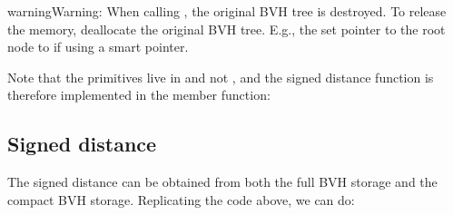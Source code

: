 \documentclass[letterpaper,10pt,english]{sphinxmanual}
\begin{document}
\begin{sphinxadmonition}{warning}{Warning:}
\sphinxAtStartPar
When calling , the original BVH tree is  destroyed.
To release the memory, deallocate the original BVH tree.
E.g., the set pointer to the root node to  if using a smart pointer.
\end{sphinxadmonition}

\sphinxAtStartPar
Note that the primitives live in  and not , and the signed distance function is therefore implemented in the  member function:

\begin{sphinxVerbatim}[commandchars=\\\{\}]

\end{sphinxVerbatim}


\subsection{Signed distance}
\label{\detokenize{ImplemBVH:id2}}
\sphinxAtStartPar
The signed distance can be obtained from both the full BVH storage and the compact BVH storage.
Replicating the code above, we can do:
\end{document}
